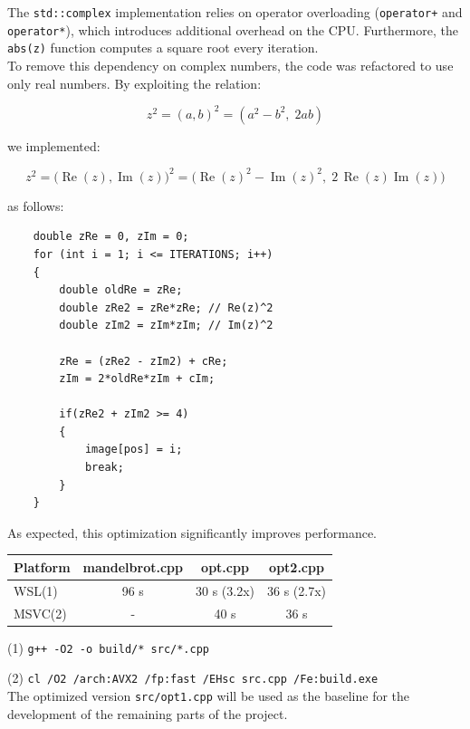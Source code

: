 \noindent
The \texttt{std::complex} implementation relies on operator overloading (\texttt{operator+} and \texttt{operator*}), which introduces additional overhead on the CPU. Furthermore, the \texttt{abs(z)} function computes a square root every iteration.\\

\noindent
To remove this dependency on complex numbers, the code was refactored to use only real numbers. By exploiting the relation:

\[
z^2 = (a, b)^2 = (a^2 - b^2, \; 2ab)
\]

\noindent
we implemented:

\[
z^2 = \big(\operatorname{Re}(z), \operatorname{Im}(z)\big)^2 
      = \big(\operatorname{Re}(z)^2 - \operatorname{Im}(z)^2, \; 2\,\operatorname{Re}(z)\operatorname{Im}(z)\big)
\]

\noindent
as follows:

\begin{lstlisting}
    double zRe = 0, zIm = 0;
    for (int i = 1; i <= ITERATIONS; i++)
    {
        double oldRe = zRe;
        double zRe2 = zRe*zRe; // Re(z)^2
        double zIm2 = zIm*zIm; // Im(z)^2

        zRe = (zRe2 - zIm2) + cRe;
        zIm = 2*oldRe*zIm + cIm;

        if(zRe2 + zIm2 >= 4)
        {
            image[pos] = i;
            break;
        }
    }
\end{lstlisting}

\noindent
As expected, this optimization significantly improves performance.

\begin{table}[h!]
\centering
\begin{tabular}{lccc}
\hline
\textbf{Platform} & \textbf{mandelbrot.cpp} & \textbf{opt.cpp} & \textbf{opt2.cpp} \\
\hline
WSL(1)     & 96 s        & 30 s (3.2x) & 36 s (2.7x) \\
MSVC(2)& -           & 40 s         & 36 s         \\
\hline
\end{tabular}
\end{table}

(1) \texttt{g++ -O2 -o build/* src/*.cpp}

(2) \texttt{cl /O2 /arch:AVX2 /fp:fast /EHsc src\*.cpp /Fe:build\*.exe}\\

\noindent
The optimized version \texttt{src/opt1.cpp} will be used as the baseline for the development of the remaining parts of the project.
